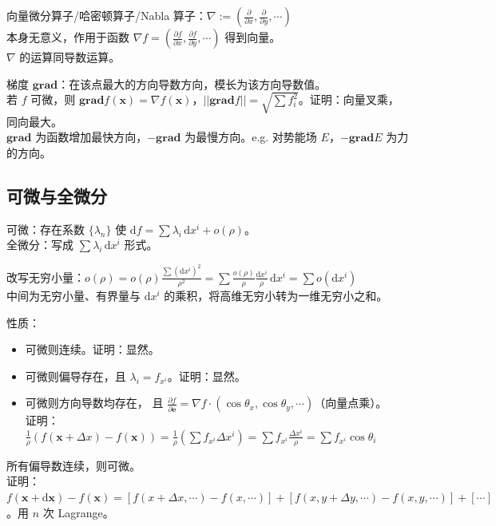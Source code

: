\documentclass[12pt, a4paper, UTF8, openany]{ctexbook}
\newcommand{\dif}{\mathrm{d}}
\newcommand{\difx}{\,\mathrm{d}x}
\newcommand{\mat}[1]{\mathbf{#1}}
\newcommand{\grad}{\mathbf{grad}}
\begin{document}
        向量微分算子/哈密顿算子/Nabla 算子：$\nabla := (\frac{\partial}{\partial x}, \frac{\partial}{\partial y}, \cdots)$ \\
        本身无意义，作用于函数 $\nabla f = (\frac{\partial f}{\partial x}, \frac{\partial f}{\partial y}, \cdots)$ 得到向量。\\
        $\nabla$ 的运算同导数运算。

        梯度 $\grad$：在该点最大的方向导数方向，模长为该方向导数值。\\
        若 $f$ 可微，则 $\grad f(\mat{x}) = \nabla f(\mat{x})$，$||\grad f|| = \sqrt{\sum f_i^2}$。证明：向量叉乘，同向最大。\\
        $\grad$ 为函数增加最快方向，$-\grad$ 为最慢方向。e.g. 对势能场 $E$，$-\grad E$ 为力的方向。

        \subsection{可微与全微分}
        可微：存在系数 $\{\lambda_n\}$ 使 $\dif f = \sum \lambda_i \difx^i + o(\rho)$。\\
        全微分：写成 $\sum \lambda_i \difx^i$ 形式。

        改写无穷小量：$o(\rho) = o(\rho)\frac{\sum (\dif x^i)^2}{\rho^2} 
        = \sum \frac{o(\rho)}{\rho} \frac{\dif x^i}{\rho} \difx^i = \sum o(\dif x^i)$ \\
        中间为无穷小量、有界量与 $\dif x^i$ 的乘积，将高维无穷小转为一维无穷小之和。

        性质：
        \begin{itemize}
            \item 可微则连续。证明：显然。
            \item 可微则偏导存在，且 $\lambda_i = f_{x^i}$。证明：显然。
            \item 可微则方向导数均存在，
            且 $\frac{\partial f}{\partial \mat{e}} = \nabla f \cdot (\cos\theta_x, \cos\theta_y, \cdots)$（向量点乘）。\\
                证明：$\frac{1}{\rho}(f(\mat{x} + \Delta x) - f(\mat{x})) = \frac{1}{\rho}(\sum f_{x^i} \Delta x^i) 
                = \sum f_{x^i} \frac{\Delta x^i}{\rho} = \sum f_{x^i} \cos\theta_i$
        \end{itemize}

        所有偏导数连续，则可微。\\
        证明：$f(\mat{x} + \dif\mat{x}) - f(\mat{x}) = 
        [f(x + \Delta x, \cdots) - f(x, \cdots)] + 
        [f(x, y + \Delta y, \cdots) - f(x, y, \cdots)] + [\cdots]$。用 $n$ 次 Lagrange。
\end{document}
